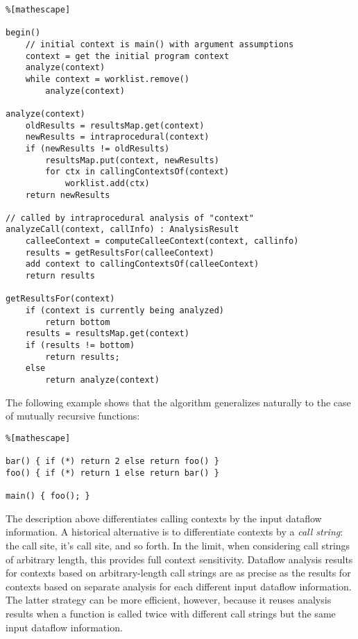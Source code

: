 \documentclass[11pt]{article}
\begin{document}
\begin{lstlisting}%[mathescape]

begin()
    // initial context is main() with argument assumptions
    context = get the initial program context
    analyze(context)
    while context = worklist.remove()
        analyze(context)

analyze(context)
    oldResults = resultsMap.get(context)
    newResults = intraprocedural(context)
    if (newResults != oldResults)
        resultsMap.put(context, newResults)
        for ctx in callingContextsOf(context)
            worklist.add(ctx)
    return newResults

// called by intraprocedural analysis of "context"	
analyzeCall(context, callInfo) : AnalysisResult
    calleeContext = computeCalleeContext(context, callinfo)
    results = getResultsFor(calleeContext)
    add context to callingContextsOf(calleeContext)
    return results

getResultsFor(context)
    if (context is currently being analyzed)
        return bottom
    results = resultsMap.get(context)
    if (results != bottom)
        return results;
    else
        return analyze(context)
\end{lstlisting}

The following example shows that the algorithm generalizes naturally to the case of mutually recursive functions:

\begin{lstlisting}%[mathescape]

bar() { if (*) return 2 else return foo() }
foo() { if (*) return 1 else return bar() }

main() { foo(); }
\end{lstlisting}

The description above differentiates calling contexts by the input dataflow information.  A historical alternative is to differentiate contexts by a \emph{call string}: the call site, it's call site, and so forth.  In the limit, when considering call strings of arbitrary length, this provides full context sensitivity.  Dataflow analysis results for contexts based on arbitrary-length call strings are as precise as the results for contexts based on separate analysis for each different input dataflow information.  The latter strategy can be more efficient, however, because it reuses analysis results when a function is called twice with different call strings but the same input dataflow information.
\end{document}
